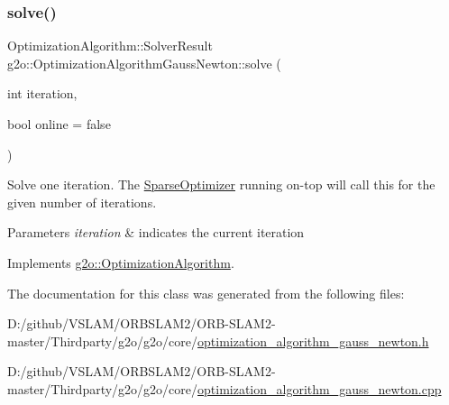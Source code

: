 \subsubsection{\texorpdfstring{solve()}{solve()}}
{\footnotesize\ttfamily Optimization\+Algorithm\+::\+Solver\+Result g2o\+::\+Optimization\+Algorithm\+Gauss\+Newton\+::solve (\begin{DoxyParamCaption}\item[{int}]{iteration,  }\item[{bool}]{online = {\ttfamily false} }\end{DoxyParamCaption})\hspace{0.3cm}{\ttfamily [virtual]}}

Solve one iteration. The \mbox{\hyperlink{classg2o_1_1_sparse_optimizer}{Sparse\+Optimizer}} running on-\/top will call this for the given number of iterations. 
\begin{DoxyParams}{Parameters}
{\em iteration} & indicates the current iteration \\
\hline
\end{DoxyParams}


Implements \mbox{\hyperlink{classg2o_1_1_optimization_algorithm_ab174deeeb2551ceaf715ea09f0f9c077}{g2o\+::\+Optimization\+Algorithm}}.



The documentation for this class was generated from the following files\+:\begin{DoxyCompactItemize}
\item 
D\+:/github/\+V\+S\+L\+A\+M/\+O\+R\+B\+S\+L\+A\+M2/\+O\+R\+B-\/\+S\+L\+A\+M2-\/master/\+Thirdparty/g2o/g2o/core/\mbox{\hyperlink{optimization__algorithm__gauss__newton_8h}{optimization\+\_\+algorithm\+\_\+gauss\+\_\+newton.\+h}}\item 
D\+:/github/\+V\+S\+L\+A\+M/\+O\+R\+B\+S\+L\+A\+M2/\+O\+R\+B-\/\+S\+L\+A\+M2-\/master/\+Thirdparty/g2o/g2o/core/\mbox{\hyperlink{optimization__algorithm__gauss__newton_8cpp}{optimization\+\_\+algorithm\+\_\+gauss\+\_\+newton.\+cpp}}\end{DoxyCompactItemize}
